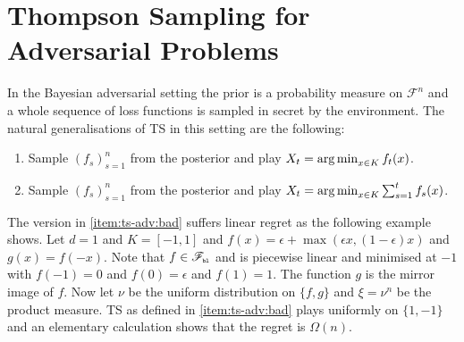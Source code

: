 \documentclass[letter, 12pt]{report}
\newcommand{\pb}{\text{\tiny\texttt{b}}}
\newcommand{\pl}{\text{\tiny\texttt{l}}}
\newcommand{\argmin}{\operatornamewithlimits{arg\,min}}
\newcommand{\sF}{\mathscr F}
\newcommand{\1}{\mathbf{1}}
\newcommand{\ts}{\textsc{TS}\xspace}
\theoremstyle{plain}
\theoremstyle{definition}
\theoremstyle{remark}
\begin{document}
\chapter{Thompson Sampling for Adversarial Problems}
In the Bayesian adversarial setting the prior is a probability measure on $\sF^n$ and a whole sequence of loss functions is sampled in secret
by the environment.
The natural generalisations of \ts{} in this setting are the following:
\begin{enumerate}
    \item Sample $(f_s)_{s=1}^n$ from the posterior and play $X_t = \argmin_{x \in K} f_t(x)$. \label{item:ts-adv:bad}
    \item Sample $(f_s)_{s=1}^n$ from the posterior and play $X_t = \argmin_{x \in K} \sum_{s=1}^t f_s(x)$. \label{item:ts-adv:ok}
\end{enumerate}
The version in \ref{item:ts-adv:bad} suffers linear regret as the following example shows.
Let $d = 1$ and $K = [-1,1]$ and $f(x) = \epsilon + \max(\epsilon x, (1 - \epsilon) x)$ and $g(x) = f(-x)$.
Note that $f \in \sF_{\pb\pl}$ and is piecewise linear and minimised at $-1$ with $f(-1) = 0$ and $f(0) = \epsilon$ and $f(1) = 1$.
The function $g$ is the mirror image of $f$.
Now let $\nu$ be the uniform distribution on $\{f, g\}$ and $\xi = \nu^n$ be the product measure.
\ts{} as defined in \ref{item:ts-adv:bad} plays uniformly on $\{1, -1\}$ and an elementary calculation shows that the regret
is $\Omega(n)$.
\end{document}
